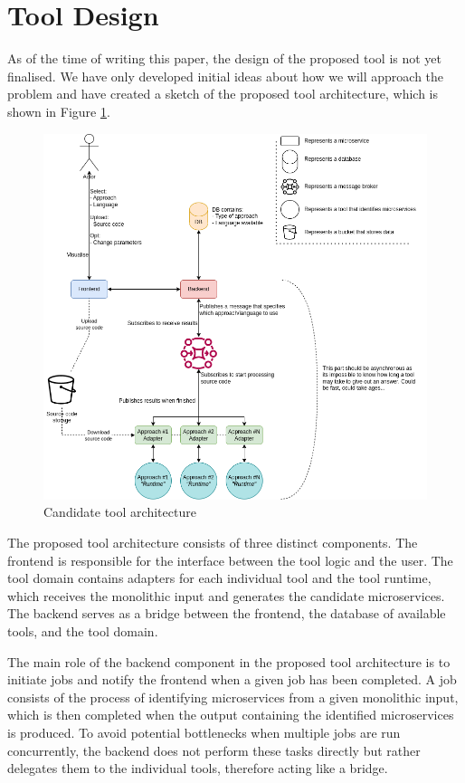 \documentclass[conference]{IEEEtran}
\begin{document}
\section{Tool Design}

As of the time of writing this paper, the design of the proposed tool is not
yet finalised. We have only developed initial ideas about how we will approach
the problem and have created a sketch of the proposed tool architecture, which
is shown in Figure \ref{fig:tool-architecture}.

\begin{figure}[!htb]
  \caption{Candidate tool architecture}
  \label{fig:tool-architecture}
  \centering
  \includegraphics[width=\textwidth]{thesis-architecture.drawio}
\end{figure}

The proposed tool architecture consists of three distinct components. The
frontend is responsible for the interface between the tool logic and the user.
The tool domain contains adapters for each individual tool and the tool
runtime, which receives the monolithic input and generates the candidate
microservices. The backend serves as a bridge between the frontend, the
database of available tools, and the tool domain.

The main role of the backend component in the proposed tool architecture is to
initiate jobs and notify the frontend when a given job has been completed. A
job consists of the process of identifying microservices from a given
monolithic input, which is then completed when the output containing the
identified microservices is produced. To avoid potential bottlenecks when
multiple jobs are run concurrently, the backend does not perform these tasks
directly but rather delegates them to the individual tools, therefore acting
like a bridge.
\end{document}

